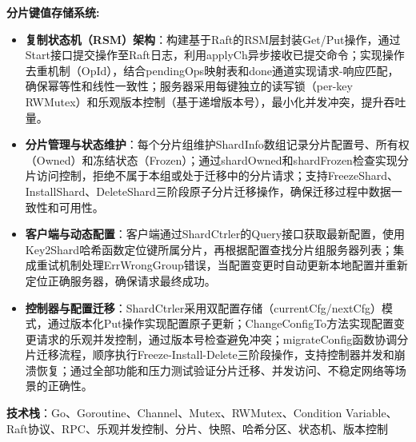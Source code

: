 \textbf{分片键值存储系统:}
    \begin{itemize}
        \item \textbf{复制状态机（RSM）架构}：构建基于Raft的RSM层封装Get/Put操作，通过Start接口提交操作至Raft日志，利用applyCh异步接收已提交命令；实现操作去重机制（OpId），结合pendingOps映射表和done通道实现请求-响应匹配，确保幂等性和线性一致性；服务器采用每键独立的读写锁（per-key RWMutex）和乐观版本控制（基于递增版本号），最小化并发冲突，提升吞吐量。
        \item \textbf{分片管理与状态维护}：每个分片组维护ShardInfo数组记录分片配置号、所有权（Owned）和冻结状态（Frozen）；通过shardOwned和shardFrozen检查实现分片访问控制，拒绝不属于本组或处于迁移中的分片请求；支持FreezeShard、InstallShard、DeleteShard三阶段原子分片迁移操作，确保迁移过程中数据一致性和可用性。
        \item \textbf{客户端与动态配置}：客户端通过ShardCtrler的Query接口获取最新配置，使用Key2Shard哈希函数定位键所属分片，再根据配置查找分片组服务器列表；集成重试机制处理ErrWrongGroup错误，当配置变更时自动更新本地配置并重新定位正确服务器，确保请求最终成功。
        \item \textbf{控制器与配置迁移}：ShardCtrler采用双配置存储（currentCfg/nextCfg）模式，通过版本化Put操作实现配置原子更新；ChangeConfigTo方法实现配置变更请求的乐观并发控制，通过版本号检查避免冲突；migrateConfig函数协调分片迁移流程，顺序执行Freeze-Install-Delete三阶段操作，支持控制器并发和崩溃恢复；通过全部功能和压力测试验证分片迁移、并发访问、不稳定网络等场景的正确性。
    \end{itemize}

\textbf{技术栈}：Go、Goroutine、Channel、Mutex、RWMutex、Condition Variable、Raft协议、RPC、乐观并发控制、分片、快照、哈希分区、状态机、版本控制
\vspace{0.2cm}
